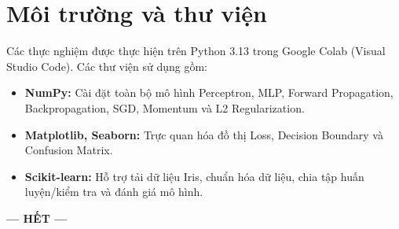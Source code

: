 \documentclass[12pt,a4paper]{report}
\begin{document}
\section{Môi trường và thư viện}
Các thực nghiệm được thực hiện trên Python 3.13 trong Google Colab (Visual Studio Code).
Các thư viện sử dụng gồm:
\begin{itemize}
    \item \textbf{NumPy:} Cài đặt toàn bộ mô hình Perceptron, MLP, Forward Propagation, Backpropagation, SGD, Momentum và L2 Regularization.
    \item \textbf{Matplotlib, Seaborn:} Trực quan hóa đồ thị Loss, Decision Boundary và Confusion Matrix.
    \item \textbf{Scikit-learn:} Hỗ trợ tải dữ liệu Iris, chuẩn hóa dữ liệu, chia tập huấn luyện/kiểm tra và đánh giá mô hình.
\end{itemize}

\begin{center}
    \vspace{1cm}
    \textbf{--- HẾT ---}
\end{center}
\end{document}
